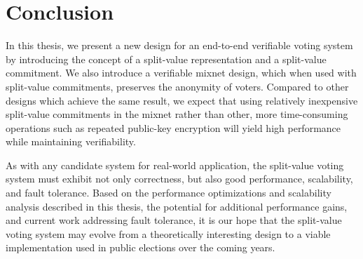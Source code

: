 \chapter{Conclusion}

In this thesis, we present a new design for an end-to-end verifiable voting system by introducing the concept of a split-value representation and a split-value commitment. We also introduce a verifiable mixnet design, which when used with split-value commitments, preserves the anonymity of voters. Compared to other designs which achieve the same result, we expect that using relatively inexpensive split-value commitments in the mixnet rather than other, more time-consuming operations such as repeated public-key encryption will yield high performance while maintaining verifiability.

As with any candidate system for real-world application, the split-value voting system must exhibit not only correctness, but also good performance, scalability, and fault tolerance. Based on the performance optimizations and scalability analysis described in this thesis, the potential for additional performance gains, and current work addressing fault tolerance, it is our hope that the split-value voting system may evolve from a theoretically interesting design to a viable implementation used in public elections over the coming years.
